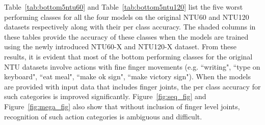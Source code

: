 \documentclass[sigconf,screen,prologue,table,dvipsnames]{acmart}
\begin{document}
Table~\ref{tab:bottom5ntu60} and Table~\ref{tab:bottom5ntu120} list the five worst performing classes for all the four models on the original NTU60 and NTU120 datasets respectively along with their per class accuracy. The shaded columns in these tables provide the accuracy of these classes when the models are trained using the newly introduced NTU60-X and NTU120-X dataset. From these results, it is evident that most of the bottom performing classes for the original NTU datasets involve actions with fine finger movements (e.g. ``writing", ``type on keyboard", ``eat meal", ``make ok sign", ``make victory sign"). When the models are provided with input data that includes finger joints, the per class accuracy for such categories is improved significantly. Figure~\ref{fig:seq_fig} and Figure~\ref{fig:mega_fig} also show that without inclusion of finger level joints, recognition of such action categories is ambiguous and difficult.
\end{document}
